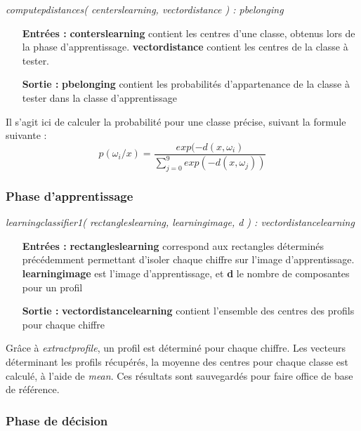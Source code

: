 \textit{computepdistances( centerslearning, vectordistance ) : pbelonging}\\
\begin{itemize}
	\item[\textbf{Entrées : }] \textbf{conterslearning} contient les centres d'une classe, obtenus lors de la phase d'apprentissage. \textbf{vectordistance} contient les centres de la classe à tester.
	\item[\textbf{Sortie :}] \textbf{pbelonging} contient les probabilités d'appartenance de la classe à tester dans la classe d'apprentissage
\end{itemize}
Il s'agit ici de calculer la probabilité pour une classe précise, suivant la formule suivante :
$$p(\omega_i/x) = \frac{exp(-d(x,\omega_i)}{\sum_{j=0}^9 exp(-d(x, \omega_j))}$$

\subsubsection{Phase d'apprentissage}

\textit{learningclassifier1( rectangleslearning, learningimage, d ) : vectordistancelearning}\\
\begin{itemize}
	\item[\textbf{Entrées :}] \textbf{rectangleslearning} correspond aux rectangles déterminés précédemment permettant d'isoler chaque chiffre sur l'image d'apprentissage. \textbf{learningimage} est l'image d'apprentissage, et \textbf{d} le nombre de composantes pour un profil
	\item[\textbf{Sortie :}] \textbf{vectordistancelearning} contient l'ensemble des centres des profils pour chaque chiffre
\end{itemize}
Grâce à \textit{extractprofile}, un profil est déterminé pour chaque chiffre. Les vecteurs déterminant les profils récupérés, la moyenne des centres pour chaque classe est calculé, à l'aide de \textit{mean}. Ces résultats sont sauvegardés pour faire office de base de référence. 

\subsubsection{Phase de décision}

